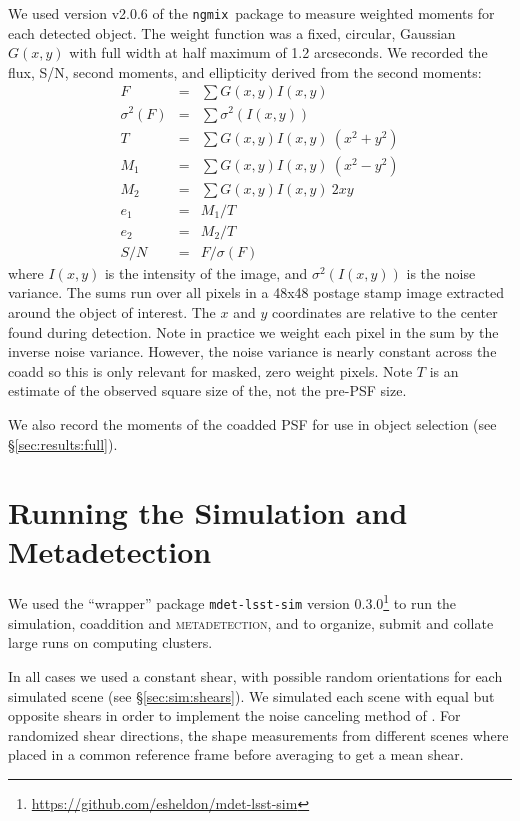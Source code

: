 \documentclass[iop, twocolappendix, appendixfloats, numberedappendix, apj]{hackemulateapj}
\newcommand{\ngmix}{\texttt{ngmix}}
\newcommand{\mdet}{\textsc{metadetection}}
\begin{document}
We used version v2.0.6 of the \ngmix\ package to measure weighted moments for
each detected object. The weight function was a fixed, circular, Gaussian $G(x,
y)$ with full width at half maximum of 1.2 arcseconds.  We recorded the flux,
S/N, second moments, and ellipticity derived from the second moments:
\begin{eqnarray} \label{eq:moments}
    F &=& \sum G(x, y) I(x, y) \\
    \sigma^2(F) &=& \sum \sigma^2(I(x, y)) \\
    T &=& \sum G(x, y) I(x, y) ~ (x^2 + y^2) \\
    M_1 &=& \sum G(x, y) I(x, y) ~ (x^2 - y^2) \\
    M_2 &=& \sum G(x, y) I(x, y) ~ 2 x y \\
    e_1 &=& M_1 / T \\
    e_2 &=& M_2 / T \\
    S/N &=& F / \sigma(F)
\end{eqnarray}
where $I(x, y)$ is the intensity of the image, and $\sigma^2(I(x, y))$ is the
noise variance. The sums run over all pixels in a 48x48 postage stamp image
extracted around the object of interest.  The $x$ and $y$ coordinates are
relative to the center found during detection.  Note in practice we weight each
pixel in the sum by the inverse noise variance. However, the noise variance is
nearly constant across the coadd so this is only relevant for masked, zero
weight pixels.  Note $T$ is an estimate of the observed square size of
the, not the pre-PSF size.

We also record the moments of the coadded PSF for use in object selection (see
\S \ref{sec:results:full}).


\section{Running the Simulation and Metadetection} \label{sec:running}

We used the ``wrapper'' package \texttt{mdet-lsst-sim} version
0.3.0\footnote{\url{https://github.com/esheldon/mdet-lsst-sim}} to run the
simulation, coaddition and \mdet, and to organize, submit and collate large
runs on computing clusters.

In all cases we used a constant shear, with possible random orientations for
each simulated scene (see \S \ref{sec:sim:shears}).  We simulated each scene
with equal but opposite shears in order to implement the noise canceling method
of \citep{pujol2019}.  For randomized shear directions, the shape measurements
from different scenes where placed in a common reference frame before averaging
to get a mean shear.
\end{document}
